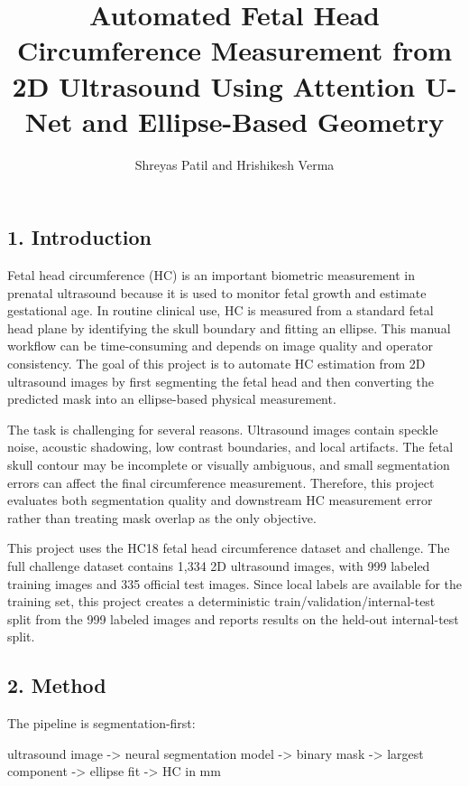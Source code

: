 \documentclass[
  10pt,
]{article}
\title{Automated Fetal Head Circumference Measurement from 2D Ultrasound
Using Attention U-Net and Ellipse-Based Geometry}
\author{Shreyas Patil and Hrishikesh Verma}
\date{}
\newenvironment{Shaded}{}{}
\newcommand{\NormalTok}[1]{#1}
\begin{document}
\maketitle

\subsection{1. Introduction}\label{introduction}

Fetal head circumference (HC) is an important biometric measurement in
prenatal ultrasound because it is used to monitor fetal growth and
estimate gestational age. In routine clinical use, HC is measured from a
standard fetal head plane by identifying the skull boundary and fitting
an ellipse. This manual workflow can be time-consuming and depends on
image quality and operator consistency. The goal of this project is to
automate HC estimation from 2D ultrasound images by first segmenting the
fetal head and then converting the predicted mask into an ellipse-based
physical measurement.

The task is challenging for several reasons. Ultrasound images contain
speckle noise, acoustic shadowing, low contrast boundaries, and local
artifacts. The fetal skull contour may be incomplete or visually
ambiguous, and small segmentation errors can affect the final
circumference measurement. Therefore, this project evaluates both
segmentation quality and downstream HC measurement error rather than
treating mask overlap as the only objective.

This project uses the HC18 fetal head circumference dataset and
challenge. The full challenge dataset contains 1,334 2D ultrasound
images, with 999 labeled training images and 335 official test images.
Since local labels are available for the training set, this project
creates a deterministic train/validation/internal-test split from the
999 labeled images and reports results on the held-out internal-test
split.

\subsection{2. Method}\label{method}

The pipeline is segmentation-first:

\begin{Shaded}
\begin{Highlighting}[]
\NormalTok{ultrasound image {-}\textgreater{} neural segmentation model {-}\textgreater{} binary mask {-}\textgreater{} largest component {-}\textgreater{} ellipse fit {-}\textgreater{} HC in mm}
\end{Highlighting}
\end{Shaded}
\end{document}
